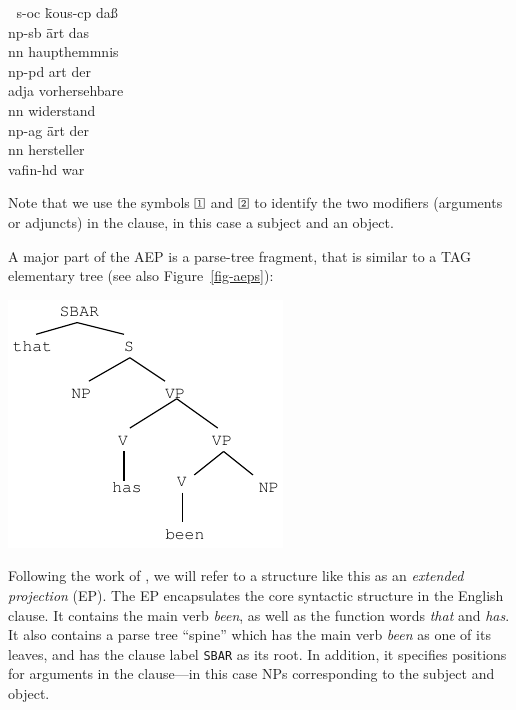 \documentclass[11pt]{report}
\theoremstyle{plain}
\begin{document}
{\begin{small}
\begin{tabbing}
$\;$\hspace{1cm} s-oc \=kous-cp da\ss\\
       \>np-sb \= \=art das\\
                     \>\>\>nn haupthemmnis\\
       \>np-pd \> \>art der\\
                     \>\>\>adja vorhersehbare\\
                     \>\>\>nn widerstand\\
               \>\>np-ag \= \=art der\\
                               \>\>\>\>nn hersteller\\
       \>vafin-hd war
\end{tabbing}
\end{small}
Note that we use the symbols $\avmbox{1}$ and $\avmbox{2}$ to identify
the two modifiers (arguments or adjuncts) in the clause, in this case
a subject and an object.

A major part of the AEP is a parse-tree fragment, that is similar to a
TAG elementary tree (see also Figure~\ref{fig-aeps}):

\begin{center}
\begin{small}
\includegraphics[scale=1]{brooke-AEP}
\end{small}
\end{center}

\noindent
Following the work of , we will refer to a
structure like this as an {\em extended projection} (EP). The EP
encapsulates the core syntactic structure in the English clause.  It
contains the main verb {\em been}, as well as the function words {\em
that} and {\em has}. It also contains a parse tree ``spine'' which has
the main verb {\em been} as one of its leaves, and has the clause
label {\tt SBAR} as its root. In addition, it specifies positions for
arguments in the clause---in this case NPs corresponding to the
subject and object.

}
\end{document}
